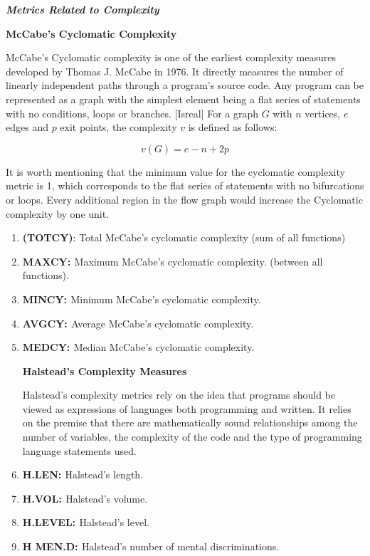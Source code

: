 \documentclass[9pt,twocolumn,a4paper]{article}
\begin{document}
{\bf{\emph{Metrics Related to Complexity}}}
\newline

{\bf{McCabe's Cyclomatic Complexity}}\newline

McCabe’s Cyclomatic complexity is one of the earliest complexity measures developed by Thomas J. McCabe in 1976. It directly measures the number of linearly independent paths through a program's source code. Any program can be represented as a graph with the simplest element being a flat series of statements with no conditions, loops or branches. [Isreal] For a graph $G$ with $n$ vertices, $e$ edges and $p$ exit points, the complexity $v$ is defined as follows:

\begin{equation}
v(G)=e-n+2p
\end{equation}

It is worth mentioning that the minimum value for the cyclomatic complexity metric is 1, which corresponds to the flat series of statements with no bifurcations or loops. Every additional region in the flow graph would increase the Cyclomatic complexity by one unit.
\begin{enumerate}
\item{\bf{ (TOTCY)}}: Total McCabe's cyclomatic complexity (sum of all functions)
\item{\bf{MAXCY: }} Maximum McCabe’s cyclomatic complexity. (between all functions).

\item{\bf{MINCY: }} Minimum McCabe’s cyclomatic complexity.
\item{\bf{AVGCY: }} Average McCabe’s cyclomatic complexity.
\item{\bf{MEDCY: }} Median McCabe’s cyclomatic complexity.

{\bf{Halstead's Complexity Measures}}

Halstead’s complexity metrics rely on the idea that programs should be viewed as expressions of languages both programming and written. It relies on the premise that there are mathematically sound relationships among the number of variables, the complexity of the code and the type of programming language statements used.

\item{\bf{H.LEN: }}Halstead’s length.
\item{\bf{H.VOL: }}Halstead's volume.

\item{\bf{H.LEVEL: }}Halstead’s level.

\item{\bf{H MEN.D: }}Halstead’s number of mental discriminations.



\end{enumerate}
\end{document}
